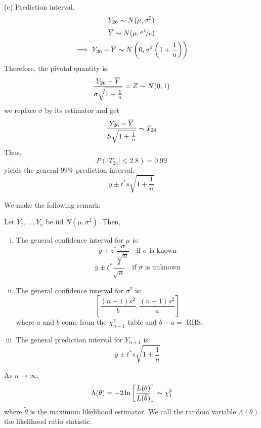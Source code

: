 \begin{exbox}
\begin{example}
        (c) Prediction interval.
        \[ Y_{26} \thicksim N(\mu,\sigma^2) \]
        \[ \overline{Y} \thicksim N(\mu,\nicefrac{\sigma^2}{n}) \]
        \[ \implies Y_{26}-\overline{Y} \thicksim N\left(0,\sigma^2\left( 1+\frac{1}{n}  \right)\right) \]
        Therefore, the pivotal quantity is:
        \[ \frac{Y_{26}-\overline{Y}}{\sigma \sqrt{1+\frac{1}{n}}} =Z \thicksim N(0,1) \]
        we replace $ \sigma $ by its estimator and get
        \[ \frac{Y_{26}-\overline{Y}}{S \sqrt{1+\frac{1}{n}}} \thicksim T_{24} \]
        Thus,
        \[ P(|T_{24}|\leqslant 2.8)=0.99 \]
        yields the general $ 99\% $ prediction interval:
        \[ \overline{y}\pm t^* s \sqrt{1+\frac{1}{n}} \]
    \end{example}
\end{exbox}
We make the following remark:
\begin{remark} Let $ Y_1,\ldots ,Y_{n} $ be iid $ N(\mu,\sigma^2) $. Then,
    \begin{enumerate}[(i)]
        \item The general confidence interval for $ \mu $ is:
              \[ \overline{y}\pm z^* \frac{\sigma}{\sqrt{n}} \quad\text{if $\sigma$ is known} \]
              \[ \overline{y}\pm t^* \frac{s}{\sqrt{n}} \quad\text{if $\sigma$ is unknown} \]
        \item The general confidence interval for $ \sigma^2 $ is:
              \[ \left[ \frac{(n-1)s^2}{b} ,\frac{(n-1)s^2}{a} \right] \]
              where $ a $ and $ b $ come from the $ \chi^2_{n-1} $ table
              and $ b-a= $ RHS.
        \item The general prediction interval for $ Y_{n+1} $ is:
              \[ \overline{y}\pm t^* s \sqrt{1+\frac{1}{n}} \]
    \end{enumerate}
\end{remark}

\begin{thmbox}
    \begin{theorem}
        As $ n\to \infty $,
        \[ \Lambda(\theta)=-2\ln\left[  \frac{L(\theta)}{L(\tilde{\theta})} \right] \thicksim \chi^2_1  \]
        where $ \tilde{\theta} $ is the maximum likelihood estimator. We call the random
        variable $ \Lambda(\theta) $ the likelihood ratio statistic.
    \end{theorem}
\end{thmbox}

